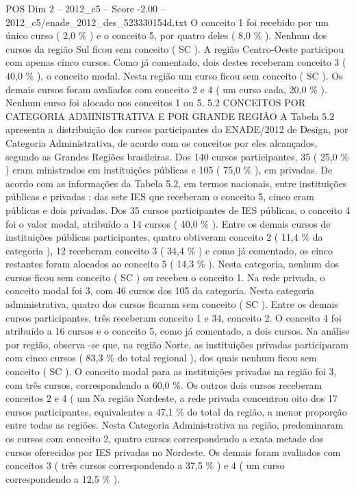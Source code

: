 \begin{textsample}{POS Dim 2 – 2012\_c5 – Score -2.00 – 2012\_c5/enade\_2012\_des\_523330154d.txt}
O conceito 1 foi recebido por um único curso ( 2,0 \% ) e o conceito 5, por quatro deles ( 8,0 \% ).
Nenhum dos cursos da região Sul ficou sem conceito ( SC ).
A região Centro-Oeste participou com apenas cinco cursos.
Como já comentado, dois destes receberam conceito 3 ( 40,0 \% ), o conceito modal.
Nesta região um curso ficou sem conceito ( SC ).
Os demais cursos foram avaliados com conceito 2 e 4 ( um curso cada, 20,0 \% ).
Nenhum curso foi alocado nos conceitos 1 ou 5. 5.2 CONCEITOS POR CATEGORIA ADMINISTRATIVA E POR GRANDE REGIÃO A Tabela 5.2 apresenta a distribuição dos cursos participantes do ENADE/2012 de Design, por Categoria Administrativa, de acordo com os conceitos por eles alcançados, segundo as Grandes Regiões brasileiras.
Dos 140 cursos participantes, 35 ( 25,0 \% ) eram ministrados em instituições públicas e 105 ( 75,0 \% ), em privadas.
De acordo com as informações da Tabela 5.2, em termos nacionais, entre instituições públicas e privadas : das sete IES que receberam o conceito 5, cinco eram públicas e dois privadas.
Dos 35 cursos participantes de IES públicas, o conceito 4 foi o valor modal, atribuído a 14 cursos ( 40,0 \% ).
Entre os demais cursos de instituições públicas participantes, quatro obtiveram conceito 2 ( 11,4 \% da categoria ), 12 receberam conceito 3 ( 34,4 \% ) e como já comentado, os cinco restantes foram alocados ao conceito 5 ( 14,3 \% ).
Nesta categoria, nenhum dos cursos ficou sem conceito ( SC ) ou recebeu o conceito 1.
Na rede privada, o conceito modal foi 3, com 46 cursos dos 105 da categoria.
Nesta categoria administrativa, quatro dos cursos ficaram sem conceito ( SC ).
Entre os demais cursos participantes, três receberam conceito 1 e 34, conceito 2.
O conceito 4 foi atribuído a 16 cursos e o conceito 5, como já comentado, a dois cursos.
Na análise por região, observa -se que, na região Norte, as instituições privadas participaram com cinco cursos ( 83,3 \% do total regional ), dos quais nenhum ficou sem conceito ( SC ).
O conceito modal para as instituições privadas na região foi 3, com três cursos, correspondendo a 60,0 \%.
Os outros dois cursos receberam conceitos 2 e 4 ( um Na região Nordeste, a rede privada concentrou oito dos 17 cursos participantes, equivalentes a 47,1 \% do total da região, a menor proporção entre todas as regiões.
Nesta Categoria Administrativa na região, predominaram os cursos com conceito 2, quatro cursos correspondendo a exata metade dos cursos oferecidos por IES privadas no Nordeste.
Os demais foram avaliados com conceitos 3 ( três cursos correspondendo a 37,5 \% ) e 4 ( um curso correspondendo a 12,5 \% ).

\end{textsample}
